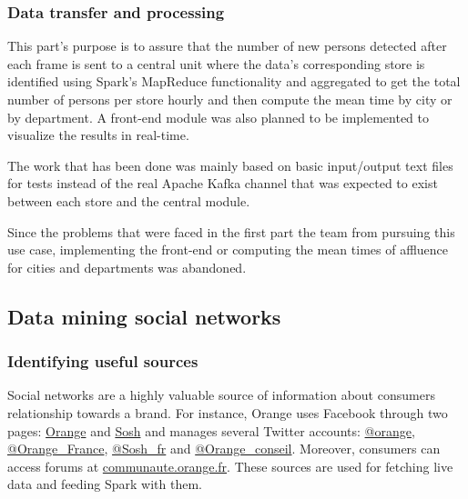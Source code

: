 \documentclass[11pt]{article}
\begin{document}

\subsubsection{Data transfer and processing}

This part’s purpose is to assure that the number of new persons detected after each frame is sent to a central unit where the data’s corresponding store is identified using \textsf{Spark}’s MapReduce functionality and aggregated to get the total number of persons per store hourly and then compute the mean time by city or by department. A front-end module was also planned to be implemented to visualize the results in real-time.

The work that has been done was mainly based on basic input/output text files for tests instead of the real \textsf{Apache Kafka} channel that was expected to exist between each store and the central module.

Since the problems that were faced in the first part the team from pursuing this use case, implementing the front-end or computing the mean times of affluence for cities and departments was abandoned.

\subsection{Data mining social networks}

\subsubsection{Identifying useful sources}

Social networks are a highly valuable source of information about consumers relationship towards a brand. For instance, \textsf{Orange} uses \textsf{Facebook} through two pages: \href{https://www.facebook.com/Orange.France/?ref=ts}{\textsf{Orange}} and \href{https://www.facebook.com/sosh/?fref=ts}{\textsf{Sosh}} and manages several \textsf{Twitter} accounts: \href{https://twitter.com/orange}{\textsf{@orange}}, \href{https://twitter.com/Orange_France}{\textsf{@Orange\_France}}, \href{https://twitter.com/Sosh_fr}{\textsf{@Sosh\_fr}} and \href{https://twitter.com/Orange_conseil}{\textsf{@Orange\_conseil}}. Moreover, consumers can access forums at \href{https://communaute.orange.fr}{\url{communaute.orange.fr}}. These sources are used for fetching live data and feeding \textsf{Spark} with them.
\end{document}
